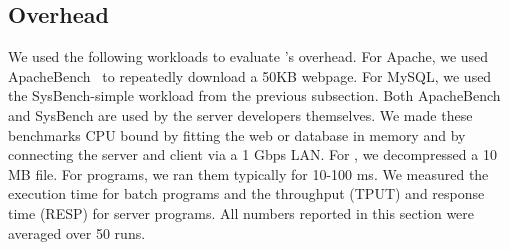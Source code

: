 

\subsection{Overhead} \label{sec:overhead}

We used the following workloads to evaluate \tern's overhead.  For Apache, we
used ApacheBench~\cite{apachebench} to repeatedly download a 50KB webpage.
For MySQL, we used the SysBench-simple workload from the  previous subsection.
Both ApacheBench and SysBench are used by the server developers themselves.
We made these benchmarks CPU bound by fitting the web or
database in memory and by connecting the server and client via a 1 Gbps
LAN.  For \pbzip, we decompressed a 10 MB file.  For \splash programs, we
ran them typically for 10-100 ms.  We measured the execution time for
batch programs and the throughput (TPUT) and response time (RESP) for
server programs.  All numbers reported in this section were averaged over
50 runs.

